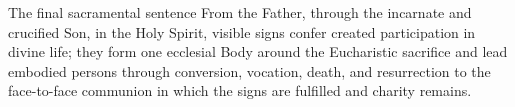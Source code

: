 \begin{studybox}{The final sacramental sentence}
From the Father, through the incarnate and crucified Son, in the Holy Spirit, visible signs confer created participation in divine life; they form one ecclesial Body around the Eucharistic sacrifice and lead embodied persons through conversion, vocation, death, and resurrection to the face-to-face communion in which the signs are fulfilled and charity remains.
\end{studybox}
